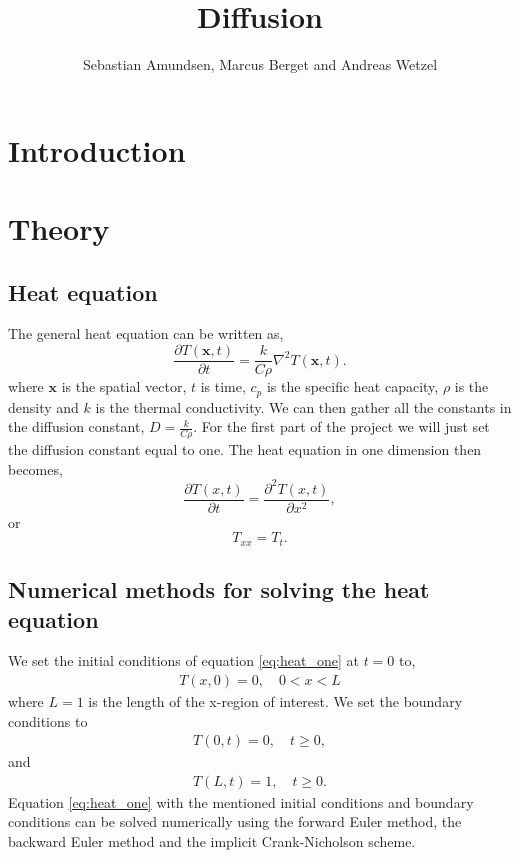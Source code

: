 \documentclass{article}
\begin{document}
\title{Diffusion}
\author{Sebastian Amundsen, Marcus Berget and Andreas Wetzel}

\maketitle

\begin{abstract}

\end{abstract}

\begin{multicols}{2}

\section{Introduction}

\section{Theory}

\subsection{Heat equation}

The general heat equation can be written as,
\begin{equation}
	\frac{\partial T(\textbf{x}, t)}{\partial t} = \frac{k}{C\rho}\nabla^2 T(\textbf{x}, t). \label{eq:gen_heat}
\end{equation}
where $\textbf{x}$ is the spatial vector, $t$ is time, $c_p$ is the specific heat capacity, $\rho$ is the density and $k$ is the thermal conductivity. We can then gather all the constants in the diffusion constant, $D=\frac{k}{C\rho}$. For the first part of the project we will just set the diffusion constant equal to one. The heat equation in one dimension then becomes, 
\begin{equation}
	\frac{\partial T(x,t)}{\partial t} = \frac{\partial^2 T(x,t)}{\partial x^2}, \label{eq:heat_one}
\end{equation}
or 
\begin{equation}
	T_{xx}=T_t.
\end{equation}
\subsection{Numerical methods for solving the heat equation}
We set the initial conditions of equation \eqref{eq:heat_one} at $t=0$ to,
\begin{align}
	T(x,0)=0, \quad 0<x<L
\end{align}
where $L=1$ is the length of the x-region of interest. We set the boundary conditions to
\begin{align}
	T(0, t)=0, \quad t\geq 0,
\end{align}
and
\begin{align}
	T(L, t)= 1, \quad t\geq 0.
\end{align}
Equation \eqref{eq:heat_one} with the mentioned initial conditions and boundary conditions can be solved numerically using the forward Euler method, the backward Euler method and the implicit Crank-Nicholson scheme. 


\end{multicols}
\end{document}
